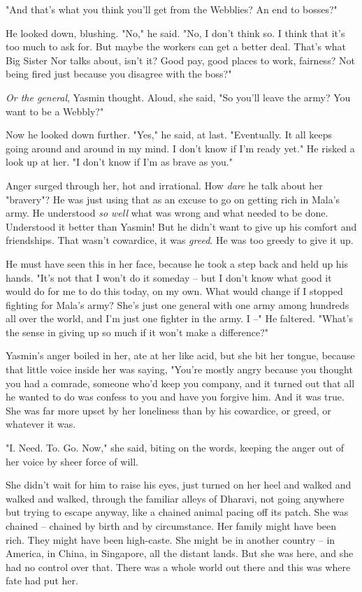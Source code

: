 "And that's what you think you'll get from the Webblies? An end to
bosses?"

He looked down, blushing. "No," he said. "No, I don't think so. I
think that it's too much to ask for. But maybe the workers can get
a better deal. That's what Big Sister Nor talks about, isn't it?
Good pay, good places to work, fairness? Not being fired just
because you disagree with the boss?"

\emph{Or the general}, Yasmin thought. Aloud, she said, "So you'll
leave the army? You want to be a Webbly?"

Now he looked down further. "Yes," he said, at last. "Eventually.
It all keeps going around and around in my mind. I don't know if
I'm ready yet." He risked a look up at her. "I don't know if I'm as
brave as you."

Anger surged through her, hot and irrational. How \emph{dare} he
talk about her "bravery"? He was just using that as an excuse to go
on getting rich in Mala's army. He understood \emph{so well} what
was wrong and what needed to be done. Understood it better than
Yasmin! But he didn't want to give up his comfort and friendships.
That wasn't cowardice, it was \emph{greed}. He was too greedy to
give it up.

He must have seen this in her face, because he took a step back and
held up his hands. "It's not that I won't do it someday -- but I
don't know what good it would do for me to do this today, on my
own. What would change if I stopped fighting for Mala's army? She's
just one general with one army among hundreds all over the world,
and I'm just one fighter in the army. I --" He faltered. "What's
the sense in giving up so much if it won't make a difference?"

Yasmin's anger boiled in her, ate at her like acid, but she bit her
tongue, because that little voice inside her was saying, "You're
mostly angry because you thought you had a comrade, someone who'd
keep you company, and it turned out that all he wanted to do was
confess to you and have you forgive him. And it was true. She was
far more upset by her loneliness than by his cowardice, or greed,
or whatever it was.

"I. Need. To. Go. Now," she said, biting on the words, keeping the
anger out of her voice by sheer force of will.

She didn't wait for him to raise his eyes, just turned on her heel
and walked and walked and walked, through the familiar alleys of
Dharavi, not going anywhere but trying to escape anyway, like a
chained animal pacing off its patch. She was chained -- chained by
birth and by circumstance. Her family might have been rich. They
might have been high-caste. She might be in another country -- in
America, in China, in Singapore, all the distant lands. But she was
here, and she had no control over that. There was a whole world out
there and this was where fate had put her.

